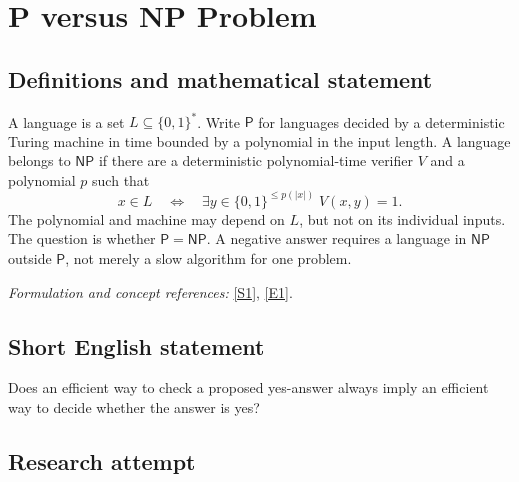 \documentclass[11pt]{article}
\newcommand{\sref}[2]{\hyperlink{source:#1:#2}{[S#2]}}
\newcommand{\eref}[2]{\hyperlink{extra:#1:#2}{[E#2]}}
\newif\ifshowcatalogue
\newcommand{\cataloguescope}[1]{\ifshowcatalogue
 \paragraph{Exact scope in the supplied catalogue.}
 \begin{quote}\small #1\end{quote}\fi}
\begin{document}
\clearpage
\section*{\texorpdfstring{P versus NP Problem}{P versus NP Problem}}\label{statement}
\subsection{Definitions and mathematical statement}
A language is a set $L\subseteq\{0,1\}^*$. Write $\mathsf P$ for languages decided by a deterministic Turing machine in time bounded by a polynomial in the input length. A language belongs to $\mathsf{NP}$ if there are a deterministic polynomial-time verifier $V$ and a polynomial $p$ such that
\[
 x\in L\quad\Longleftrightarrow\quad \exists y\in\{0,1\}^{\le p(|x|)}\;V(x,y)=1.
\]
The polynomial and machine may depend on $L$, but not on its individual inputs. The question is whether $\mathsf P=\mathsf{NP}$. A negative answer requires a language in $\mathsf{NP}$ outside $\mathsf P$, not merely a slow algorithm for one problem.
\par\smallskip\textit{Formulation and concept references:} \sref{statement}{1}, \eref{statement}{1}.
\cataloguescope{Determine whether P = NP, that is, whether every decision problem whose solutions can be verified in polynomial time by a deterministic Turing machine can also be solved in polynomial time by a deterministic Turing machine.}
\subsection{Short English statement}
Does an efficient way to check a proposed yes-answer always imply an efficient way to decide whether the answer is yes?
\subsection{Research attempt}
\end{document}
